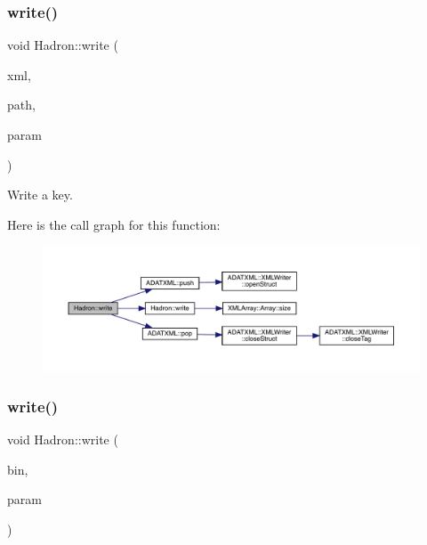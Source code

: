 \subsubsection{\texorpdfstring{write()}{write()}\hspace{0.1cm}{\footnotesize\ttfamily [25/95]}}
{\footnotesize\ttfamily void Hadron\+::write (\begin{DoxyParamCaption}\item[{\mbox{\hyperlink{classADATXML_1_1XMLWriter}{X\+M\+L\+Writer}} \&}]{xml,  }\item[{const std\+::string \&}]{path,  }\item[{const \mbox{\hyperlink{structHadron_1_1KeyGlueElementalOperator__t}{Key\+Glue\+Elemental\+Operator\+\_\+t}} \&}]{param }\end{DoxyParamCaption})}



Write a key. 

Here is the call graph for this function\+:\nopagebreak
\begin{figure}[H]
\begin{center}
\leavevmode
\includegraphics[width=350pt]{d1/daf/namespaceHadron_a4ae7852bf18d56cb1a966ce318245ea6_cgraph}
\end{center}
\end{figure}
\mbox{\label{namespaceHadron_a1f7e7b8c782fddd330a9f4491bd37e22}} 
\subsubsection{\texorpdfstring{write()}{write()}\hspace{0.1cm}{\footnotesize\ttfamily [26/95]}}
{\footnotesize\ttfamily void Hadron\+::write (\begin{DoxyParamCaption}\item[{\mbox{\hyperlink{classADATIO_1_1BinaryWriter}{Binary\+Writer}} \&}]{bin,  }\item[{const \mbox{\hyperlink{structHadron_1_1KeyPeramDist__t}{Key\+Peram\+Dist\+\_\+t}} \&}]{param }\end{DoxyParamCaption})}




